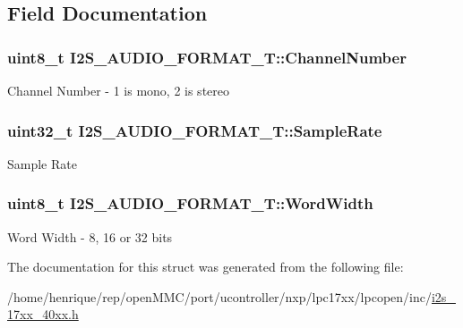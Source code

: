 \subsection{Field Documentation}
\hypertarget{structI2S__AUDIO__FORMAT__T_ad9856c3cfc176a9c5f25851dda4d848d}{
\subsubsection[{Channel\-Number}]{\setlength{\rightskip}{0pt plus 5cm}uint8\-\_\-t I2\-S\-\_\-\-A\-U\-D\-I\-O\-\_\-\-F\-O\-R\-M\-A\-T\-\_\-\-T\-::\-Channel\-Number}}\label{structI2S__AUDIO__FORMAT__T_ad9856c3cfc176a9c5f25851dda4d848d}
Channel Number -\/ 1 is mono, 2 is stereo \hypertarget{structI2S__AUDIO__FORMAT__T_aef370fad5b70b5226a2f8a780bd934d9}{
\subsubsection[{Sample\-Rate}]{\setlength{\rightskip}{0pt plus 5cm}uint32\-\_\-t I2\-S\-\_\-\-A\-U\-D\-I\-O\-\_\-\-F\-O\-R\-M\-A\-T\-\_\-\-T\-::\-Sample\-Rate}}\label{structI2S__AUDIO__FORMAT__T_aef370fad5b70b5226a2f8a780bd934d9}
Sample Rate \hypertarget{structI2S__AUDIO__FORMAT__T_a5b21d5d739e0eb7e66c898618fcd4605}{
\subsubsection[{Word\-Width}]{\setlength{\rightskip}{0pt plus 5cm}uint8\-\_\-t I2\-S\-\_\-\-A\-U\-D\-I\-O\-\_\-\-F\-O\-R\-M\-A\-T\-\_\-\-T\-::\-Word\-Width}}\label{structI2S__AUDIO__FORMAT__T_a5b21d5d739e0eb7e66c898618fcd4605}
Word Width -\/ 8, 16 or 32 bits 

The documentation for this struct was generated from the following file\-:\begin{DoxyCompactItemize}
\item 
/home/henrique/rep/open\-M\-M\-C/port/ucontroller/nxp/lpc17xx/lpcopen/inc/\hyperlink{i2s__17xx__40xx_8h}{i2s\-\_\-17xx\-\_\-40xx.\-h}\end{DoxyCompactItemize}
